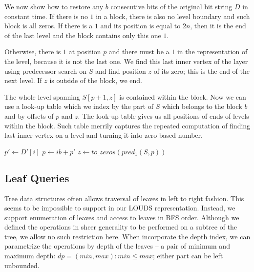 We now show how to restore any $b$ consecutive bits of the original bit string $D$ in constant time.
If there is no $1$ in a block, there is also no level boundary and such block is all zeros.
If there is a $1$ and its position is equal to $2n$, then it is the end of the last level and the block contains only this one $1$.

Otherwise, there is $1$ at position $p$ and there must be a $1$ in the representation of the level, because it is not the last one.
We find this last inner vertex of the layer using predecessor search on $S$ and find position $z$ of its zero; this is the end of the next level.
If $z$ is outside of the block, we end.

The whole level spanning $S[p+1, z]$ is contained within the block.
Now we can use a look-up table which we index by the part of $S$ which belongs to the block $b$ and by offsets of $p$ and $z$.
The look-up table gives us all positions of ends of levels within the block.
Such table merrily captures the repeated computation of finding last inner vertex on a level and turning it into zero-based number.

\begin{algorithmic}
	\State $p' \gets D'[i]$
	 
		\State {}
	\Else
		\State $p \gets i b + p'$
		 
			\State {} 
		\Else
			\State $z \gets to\_zeros(pred_1(S, p))$
			 
				\State {}
			\Else
				\State {}
			\EndIf
		\EndIf
	\EndIf
\EndFunction
\end{algorithmic}

\subsection{Leaf Queries}

Tree data structures often allows traversal of leaves in left to right fashion.
This seems to be impossible to support in our LOUDS representation.
Instead, we support enumeration of leaves and access to leaves in BFS order.
Although we defined the operations in sheer generality to be performed on a subtree of the tree, we allow no such restriction here.
When incorporate the depth index, we can parametrize the operations by depth of the leaves -- a pair of minimum and maximum depth: $dp = (min, max): min \le max$; either part can be left unbounded.

